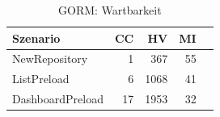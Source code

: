 \begin{table}[ht]
\centering
\caption{GORM: Wartbarkeit}
\begin{tabular}{lrrrr}
\toprule
Szenario & CC & HV & MI \\
\midrule
	NewRepository & 1 & 367 & 55 \\
	ListPreload & 6 & 1068 & 41 \\
	DashboardPreload & 17 & 1953 & 32 \\
\bottomrule
\end{tabular}
\label{tab:gorm_maintainability}
\end{table}
	